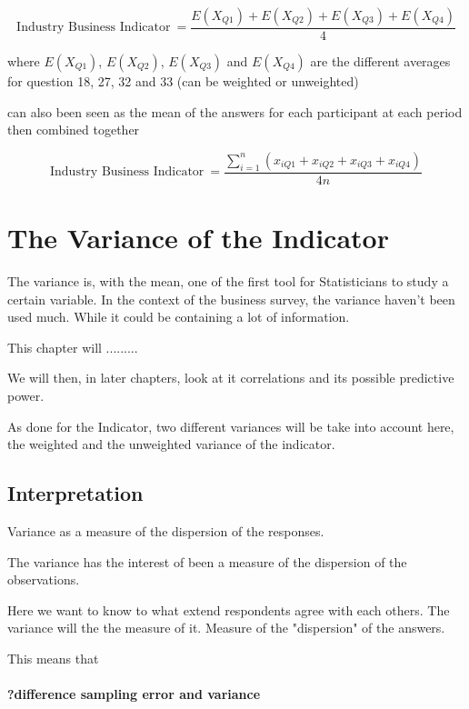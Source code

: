 \documentclass[12pt,a4paper,oneside]{book}
\begin{document}
\begin{equation}
    \mbox{Industry Business Indicator}\ = \frac{E(X_{Q1}) + E(X_{Q2}) + E(X_{Q3}) + E(X_{Q4})}{4}
\end{equation}

where 
$E(X_{Q1})$, $E(X_{Q2})$, $E(X_{Q3})$ and $E(X_{Q4})$ are the different averages for question 18, 27, 32 and 33 (can be weighted or unweighted)

can also been seen as the mean of the answers for each participant at each period then combined together

\begin{equation}
    \mbox{Industry Business Indicator}\ = \frac{\sum_{i=1}^n \left(x_{i Q1} + x_{i Q2} + x_{i Q3} + x_{i Q4} \right)}{4n}
\end{equation}


\chapter{The Variance of the Indicator}

The variance is, with the mean, one of the first tool for Statisticians to study a certain variable.
In the context of the business survey, the variance haven't been used much. While it could be containing a lot of information.

This chapter will .........

We will then, in later chapters, look at it correlations and its possible predictive power.


As done for the Indicator, two different variances will be take into account here, the weighted and the unweighted variance of the indicator.

\section{Interpretation}
Variance as a measure of the dispersion of the responses.

The variance has the interest of been a measure of the dispersion of the observations. 

Here we want to know to what extend respondents agree with each others. The variance will the the measure of it. 
Measure of the "dispersion" of the answers.

This means that 


\subsubsection{?difference sampling error and variance}
\end{document}
